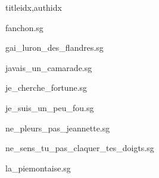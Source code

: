 \documentclass[12pt]{article}
\begin{document}
\begin{songs}{titleidx,authidx}

{fanchon.sg}


{gai_luron_des_flandres.sg}


{javais_un_camarade.sg}


{je_cherche_fortune.sg}


{je_suis_un_peu_fou.sg}


{ne_pleurs_pas_jeannette.sg}


{ne_sens_tu_pas_claquer_tes_doigts.sg}


{la_piemontaise.sg}



\end{songs}
\end{document}
